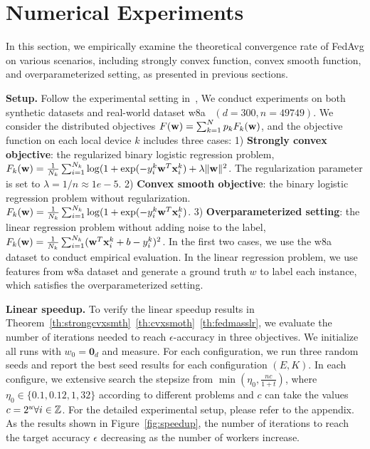 


\section{Numerical Experiments}

In this section, we empirically examine the theoretical convergence rate of FedAvg on various scenarios, including strongly convex function, convex smooth function, and overparameterized setting, as presented in previous sections.

\textbf{Setup.} Follow the experimental setting in~\cite{stich2018local}, We
conduct experiments on both synthetic datasets and real-world dataset
w8a~\cite{platt1998fast} $(d=300, n=49749)$. We consider the distributed
objectives $F({\mathbf{w}}) = \sum_{k=1}^N p_kF_k({\mathbf{w}})$, and the objective function on
each local device $k$ includes three cases: 1) \textbf{Strongly convex
objective}: the regularized binary logistic regression problem, $F_k({\mathbf{w}}) =
\frac{1}{N_k} \sum_{i=1}^{N_k} \log( 1+ \exp(-y_i^k {\mathbf{w}}^T{\mathbf{x}}_i^k) + \lambda
\|{\mathbf{w}}\|^2$. The regularization parameter is set to $\lambda = 1/n \approx
1e-5$. 2) \textbf{Convex smooth objective}: the binary logistic regression
problem without regularization. $F_k({\mathbf{w}}) = \frac{1}{N_k} \sum_{i=1}^{N_k}
\log( 1+ \exp(-y_i^k {\mathbf{w}}^T{\mathbf{x}}_i^k)$. 3) \textbf{Overparameterized setting}:
the linear regression problem without adding noise to the label, $F_k({\mathbf{w}}) =
\frac{1}{N_k} \sum_{i=1}^{N_k} ({\mathbf{w}}^T{\mathbf{x}}_i^k + b  - y_i^k)^2$.  In the first
two cases, we use the w8a dataset to conduct empirical evaluation. 
In the linear regression problem, we use features from w8a dataset and 
generate a ground truth $w$ to label each instance, which satisfies the
overparameterized setting.


\textbf{Linear speedup.} To verify the linear speedup results in Theorem~\ref{th:strongcvxsmth}~\ref{th:cvxsmoth}~\ref{th:fedmasslr}, we evaluate the number of iterations needed to reach
$\epsilon$-accuracy in three objectives. We initialize all runs with $w_0 = \textbf{0}_d$ and measure. For each configuration, we run three random seeds and report
the best seed results for each configuration $(E, K)$. In each configure, we
extensive search the stepsize from $\min(\eta_0, \frac{nc}{1 + t})$, where
$\eta_0 \in \{0.1, 0.12, 1, 32 \}$ according to different problems and $c$ can
take the values $c = 2^u \forall i \in \mathbb{Z}$. For the detailed experimental setup,
please refer to the appendix. As the results shown in Figure~\ref{fig:speedup},
the number of iterations to reach the target accuracy $\epsilon$ decreasing 
as the number of workers increase. 

